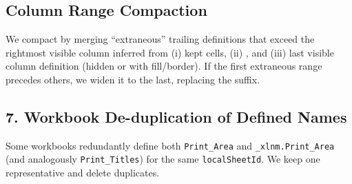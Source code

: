 \subsection{Column Range Compaction}
\label{sec:columns}

We compact  by merging “extraneous” trailing definitions
that exceed the rightmost visible column inferred from (i) kept cells,
(ii) , and (iii) last visible column definition (hidden or with fill/border).
If the first extraneous range precedes others, we widen it to the last, replacing the suffix.

\begin{algorithm}
\DontPrintSemicolon
{}
\caption{Compacting column ranges beyond the last visible column.}
\label{alg:cols}
\end{algorithm}

\subsection{7. Workbook De-duplication of Defined Names}

Some workbooks redundantly define both \texttt{Print\_Area} and \texttt{\_xlnm.Print\_Area} (and analogously \texttt{Print\_Titles}) for the same \texttt{localSheetId}. We keep one representative and delete duplicates.

\begin{algorithm}
\DontPrintSemicolon
{}
\caption{Workbook de-duplication of \texttt{<definedNames>}.}
\label{alg:wb}
\end{algorithm}



